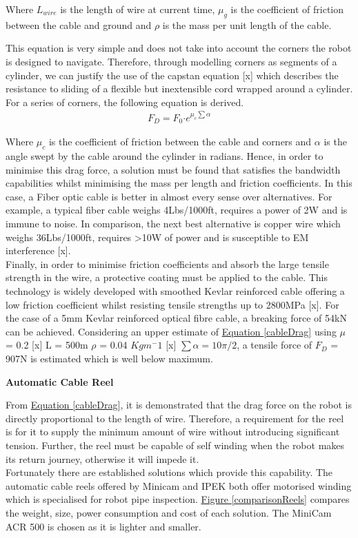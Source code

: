 \documentclass[11pt]{article}		%
\newcommand{\figref}[1]{\hyperref[#1]{Figure \ref*{#1}}}    %
\newcommand{\equationref}[1]{\hyperref[#1]{Equation \ref*{#1}}}     %
\begin{document}
	        Where $L_{wire}$ is the length of wire at current time, $\mu_g$ is the coefficient of friction between the cable and ground and $\rho$ is the mass per unit length of the cable.
	        
	        This equation is very simple and does not take into account the corners the robot is designed to navigate. 
	        Therefore, through modelling corners as segments of a cylinder, we can justify the use of the capstan equation [x] which describes the resistance to sliding of a flexible but inextensible cord wrapped around a cylinder. 
	        For a series of corners, the following equation is derived.
	        \begin{align}
	                F_D = F_0 \boldsymbol{\cdot} {e}^{\mu_c \sum \alpha} \label{cableDrag}
	        \end{align}
	
			Where $\mu_c$ is the coefficient of friction between the cable and corners and $\alpha$ is the angle swept by the cable around the cylinder in radians. 
		    Hence, in order to minimise this drag force, a solution must be found that satisfies the bandwidth capabilities whilst minimising the mass per length and friction coefficients.  
		    In this case, a Fiber optic cable is better in almost every sense over alternatives. 
		    For example, a typical fiber cable weighs 4Lbs/1000ft, requires a power of 2W and is immune to noise. 
		    In comparison, the next best alternative is copper wire which weighs 36Lbs/1000ft, requires >10W of power and is susceptible to EM interference [x].
		    \\
		    Finally, in order to minimise friction coefficients and absorb the large tensile strength in the wire, a protective coating must be applied to the cable. 
		    This technology is widely developed with smoothed Kevlar reinforced cable offering a low friction coefficient whilst resisting tensile strengths up to 2800MPa [x]. For the case of a 5mm Kevlar reinforced optical fibre cable, a breaking force of 54kN can be achieved. 
		    Considering an upper estimate of \equationref{cableDrag} using $\mu$ = 0.2 [x] L = 500m $\rho$ = 0.04 $Kgm^-1$ [x] $\sum \alpha = 10\pi/2$, a tensile force of $F_D$ = 907N is estimated which is well below maximum. 
		    
		    \textbf{Automatic Cable Reel}
	
	        From \equationref{cableDrag}, it is demonstrated that the drag force on the robot is directly proportional to the length of wire. 
	        Therefore, a requirement for the reel is for it to supply the minimum amount of wire without introducing significant tension. 
	        Further, the reel must be capable of self winding when the robot makes its return journey, otherwise it will impede it.
	        \\ 
	        \hspace*{3ex}Fortunately there are established solutions which provide this capability. 
	        The automatic cable reels offered by Minicam and IPEK both offer motorised winding which is specialised for robot pipe inspection. 
	        \figref{comparisonReels} compares the weight, size, power consumption and cost of each solution. 
	        The MiniCam ACR 500 is chosen as it is lighter and smaller. 
	
\end{document}
